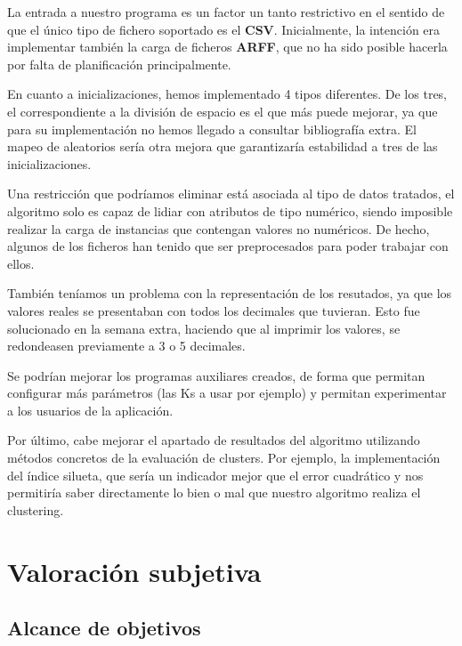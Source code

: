 \documentclass[a4paper]{report}
\begin{document}
La entrada a nuestro programa es un factor un tanto restrictivo en el sentido de que el único tipo de fichero soportado es el \textbf{CSV}. Inicialmente, la intención era implementar también la carga de ficheros \textbf{ARFF}, que no ha sido posible hacerla por falta de planificación principalmente.

En cuanto a inicializaciones, hemos implementado 4 tipos diferentes. De los tres, el correspondiente a la división de espacio es el que más puede mejorar, ya que para su implementación no hemos llegado a consultar bibliografía extra. El mapeo de aleatorios sería otra mejora que garantizaría estabilidad a tres de las inicializaciones.

Una restricción que podríamos eliminar está asociada al tipo de datos tratados, el algoritmo solo es capaz de lidiar con atributos de tipo numérico, siendo imposible realizar la carga de instancias que contengan valores no numéricos. De hecho, algunos de los ficheros han tenido que ser preprocesados para poder trabajar con ellos.

También teníamos un problema con la representación de los resutados, ya que los valores reales se presentaban con todos los decimales que tuvieran. Esto fue solucionado en la semana extra, haciendo que al imprimir los valores, se redondeasen previamente a 3 o 5 decimales.

Se podrían mejorar los programas auxiliares creados, de forma que permitan configurar más parámetros (las Ks a usar por ejemplo) y permitan experimentar a los usuarios de la aplicación.

Por último, cabe mejorar el apartado de resultados del algoritmo utilizando métodos concretos de la evaluación de clusters. Por ejemplo, la implementación del índice silueta, que sería un indicador mejor que el error cuadrático y nos permitiría saber directamente lo bien o mal que nuestro algoritmo realiza el clustering.




\newpage




\newpage


\chapter{Valoración subjetiva}
	
	\section*{Alcance de objetivos}
	
\end{document}
